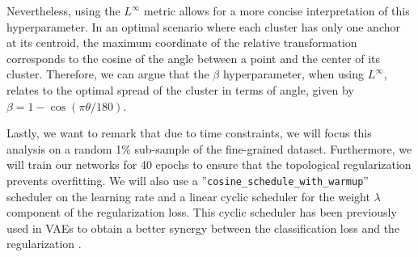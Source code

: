 \documentclass[../main.tex]{subfiles}
\begin{document}
\begin{enumerate}
   Nevertheless, using the $L^\infty$ metric allows for a more concise interpretation of this hyperparameter. In an optimal scenario where each cluster has only one anchor at its centroid, the maximum coordinate of the relative transformation corresponds to the cosine of the angle between a point and the center of its cluster. Therefore, we can argue that the $\beta$ hyperparameter, when using $L^\infty$, relates to the optimal spread of the cluster in terms of angle, given by $\beta = 1 - \cos(\pi\theta/180)$.
\end{enumerate}


Lastly, we want to remark that due to time constraints, we will focus this analysis on a random 1\% sub-sample of the fine-grained dataset. Furthermore, we will train our networks for 40 epochs to ensure that the topological regularization prevents overfitting. We will also use a ''\texttt{cosine\_schedule\_with\_warmup}'' scheduler on the learning rate and a linear cyclic scheduler for the weight $\lambda$ component of the regularization loss. This cyclic scheduler has been previously used in VAEs to obtain a better synergy between the classification loss and the regularization \cite{fu_cyclical_2019}.
\end{document}
